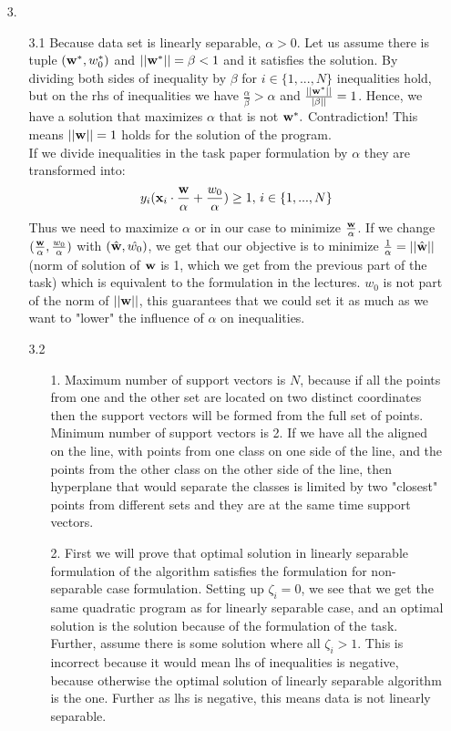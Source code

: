 \documentclass[10pt,a4paper]{article}
\begin{document}
\begin{enumerate}
\item[3.]
\begin{enumerate}
\item[3.1]
Because data set is linearly separable, $\alpha > 0$.
Let us assume there is tuple $(\textbf{\text{{w}}}^*, w_0^*)$ and $||\textbf{\text{{w}}}^*|| = \beta < 1$ and it satisfies the solution. By dividing both sides of inequality by $\beta$ for $i\in \{ 1, ..., N\}$ inequalities hold, but on the rhs of inequalities we have $\frac{\alpha}{\beta} > \alpha$ and $\frac{||\textbf{\text{{w}}}^*||}{|\beta||} = 1$. Hence, we have a solution that maximizes $\alpha$ that is not $\textbf{\text{{w}}}^*.$ Contradiction! This means $||\textbf{\text{{w}}}||=1$ holds for the solution of the program. \\
If we divide inequalities in the task paper formulation by $\alpha$ they are transformed into:
$$y_i(\textbf{\text{{x}}}_i\cdot \frac{\textbf{\text{{w}}}}{\alpha} + \frac{w_0}{\alpha})\geq 1,\, i\in \{1, ..., N\}$$ Thus we need to maximize $\alpha$ or in our case to minimize $\frac{\textbf{\text{{w}}}}{\alpha}$. If we change $(\frac{\textbf{\text{{w}}}}{\alpha}, \frac{w_0}{\alpha})$ with $(\hat{\textbf{\text{{w}}}}, \hat{w_0})$, we get that our objective is to minimize $\frac{1}{\alpha} = ||\hat{\textbf{\text{{w}}}}||$ (norm of solution of $\textbf{\text{{w}}}$ is 1, which we get from the previous part of the task) which is equivalent to the formulation in the lectures. $w_0$ is not part of the norm of $||\textbf{\text{{w}}}||$, this guarantees that we could set it as much as we want to "lower" the influence of $\alpha$ on inequalities. 
\item[3.2]
\begin{enumerate}
\item[1.]
Maximum number of support vectors is $N$, because if all the points from one and the other set are located on two distinct coordinates then the support vectors will be formed from the full set of points. Minimum number of support vectors is 2. If we have all the aligned on the line, with points from one class on one side of the line, and the points from the other class on the other side of the line, then hyperplane that would separate the classes is limited by two "closest" points from different sets and they are at the same time support vectors.
\item[2.]
First we will prove that optimal solution in linearly separable formulation of the algorithm satisfies the formulation for non-separable case formulation. Setting up $\zeta_i = 0$, we see that we get the same quadratic program as for linearly separable case, and an optimal solution is the solution because of the formulation of the task. Further, assume there is some solution where all $\zeta_i > 1$. This is incorrect because it would mean lhs of inequalities is negative, because otherwise the optimal solution of linearly separable algorithm is the one. Further as lhs is negative, this means data is not linearly separable. 

\end{enumerate}
\end{enumerate}
\end{enumerate}
\end{document}
